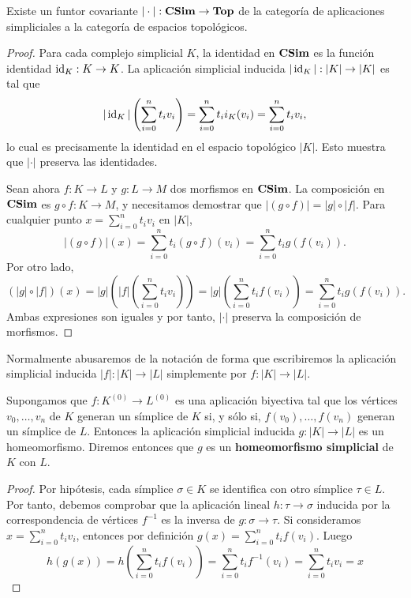 \begin{proposicion}
	Existe un funtor covariante $|\cdot| : \mathbf{CSim}\to \mathbf{Top}$ de la categoría
	de aplicaciones simpliciales a la categoría de espacios topológicos.
\end{proposicion}
\begin{proof}
	Para cada complejo simplicial $K$, la identidad en $\mathbf{CSim}$ es la función
	identidad $\operatorname{id}_{K}: K \to K$. La aplicación simplicial inducida $|\operatorname{id}_{K}| : |
	K| \to |K|$ es tal que
	\[
	|\operatorname{id}_{K}|\left(\sum_{i=0}^{n}t_{i}v_{i}\right) = \sum_{i=0}^{n}t_{i}i_{K}(v_{i}
	) = \sum_{i=0}^{n}t_{i}v_{i},
	\]
	lo cual es precisamente la identidad en el espacio topológico $|K|$. Esto
	muestra que $|\cdot|$ preserva las identidades.
	
	Sean ahora $f: K \to L$ y $g: L \to M$ dos morfismos en $\mathbf{CSim}$. La composición
	en $\mathbf{CSim}$ es $g \circ f: K \to M$, y necesitamos demostrar que
	$|(g \circ f)| = |g| \circ |f|$. Para cualquier punto $x = \sum_{i=0}^{n}t_{i}v
	_{i}$ en $|K|$,
	\[
	|(g \circ f)|(x) = \sum_{i=0}^{n}t_{i}(g \circ f)(v_{i}) = \sum_{i=0}^{n}t_{i}
	g(f(v_{i})).
	\]
	Por otro lado,
	\[
	(|g| \circ |f|)(x) = |g|\left(|f|\left(\sum_{i=0}^{n}t_{i}v_{i}\right)\right
	) = |g|\left(\sum_{i=0}^{n}t_{i}f(v_{i})\right) = \sum_{i=0}^{n}t_{i}g(f(v_{i}
	)).
	\]
	Ambas expresiones son iguales y por tanto, $|\cdot|$ preserva la composición
	de morfismos.
\end{proof}

Normalmente abusaremos de la notación de forma que escribiremos la aplicación
simplicial inducida $|f| : |K| \to |L|$ simplemente por $f : |K| \to |L|$.

\begin{lema}
	\label{lem:homeo_complex} Supongamos que $f:K^{(0)}\rightarrow L^{(0)}$ es una
	aplicación biyectiva tal que los vértices $v_{0}, \ldots, v_{n}$ de $K$ generan
	un símplice de $K$ si, y sólo si, $f(v_{0}), \ldots, f(v_{n})$ generan un símplice
	de $L$. Entonces la aplicación simplicial inducida $g:|K| \rightarrow |L|$ es
	un homeomorfismo. Diremos entonces que $g$ es un \textbf{homeomorfismo
		simplicial} de $K$ con $L$.
\end{lema}
\begin{proof}
	Por hipótesis, cada símplice $\sigma \in K$ se identifica con otro símplice
	$\tau \in L$. Por tanto, debemos comprobar que la aplicación lineal
	$h: \tau \rightarrow \sigma$ inducida por la correspondencia de vértices
	$f^{-1}$ es la inversa de $g: \sigma \rightarrow \tau$. Si consideramos $x = \sum
	_{i=0}^{n}t_{i}v_{i}$, entonces por definición
	$g(x) = \sum_{i=0}^{n}t_{i}f(v_{i})$. Luego
	\[
	h(g(x)) = h(\sum_{i=0}^{n}t_{i}f(v_{i})) = \sum_{i=0}^{n}t_{i}f^{-1}(v_{i}) =
	\sum_{i=0}^{n}t_{i}v_{i}= x
	\]
\end{proof}

